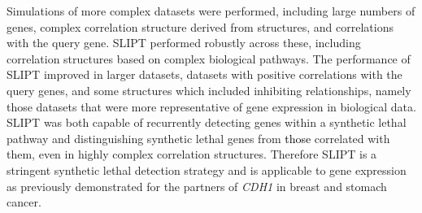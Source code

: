 Simulations of more complex datasets were performed, including large numbers of genes, complex correlation structure derived from  structures, and correlations with the query gene. \gls{SLIPT} performed robustly across these, including correlation structures based on complex biological pathways. The performance of \gls{SLIPT} improved in larger datasets, datasets with positive correlations with the query genes, and some  structures which included inhibiting relationships, namely those datasets that were more representative of \gls{gene expression} in biological data. \gls{SLIPT} was both capable of recurrently detecting genes within a \gls{synthetic lethal} pathway and distinguishing \gls{synthetic lethal} genes from \textcolor{black}{those} correlated with them, even in highly complex correlation structures. Therefore \gls{SLIPT} is a stringent \gls{synthetic lethal} detection strategy and is applicable to \gls{gene expression} as previously demonstrated for the partners of \textit{CDH1} in breast and stomach cancer. %

\clearpage

\iffalse
\paragraph{Aims}

  \begin{itemize}
   \item A Model of Synthetic Lethal Genes in Gene Expression Data
   
   \bigskip
   
   \item Comparison of SLIPT to Alternative Approaches
   
   \bigskip
   
   \item Simulations of Known Synthetic Lethal Genes within Pathway Networks
      
  \end{itemize}

\paragraph{Summary}

    \begin{itemize}
      \item I have designed a straight-forward rational query-based \gls{synthetic lethal} detection method with the example of application to \textit{CDH1} in cancer \gls{gene expression}
      
      \bigskip
      
      \item I have developed a simulation pipeline to generate continuous \gls{gene expression} with \glslink{graph}{pathway} structure including a procedure to simulate \glspl{synthetic lethal} 
      
      \bigskip
      
      \item The simulation procedure shows that SLIPT is robust across \glslink{graph}{pathway} structures and has desirable performance compared to other statistical techniques 
      \end{itemize}
\fi